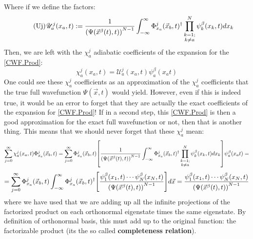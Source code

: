 \documentclass[11pt, a4paper]{article} %
\newcommand{\U}{\mathscr{U}}
\begin{document}
Where if we define the factors:
\begin{equation}\label{Uj}\tag{Uj}
\U^j_a(x_a,t):=\frac{1}{ \qty(\Psi(\vec{x}^\beta(t),t))^{N-1}} \int_{-\infty}^\infty \Phi_{x_a}^j(\vec{x}_b,t)^\dagger \prod_{\substack{k=1; \\ k\neq a}}^{N}\psi^\beta_k(x_k,t) dx_k \vspace{-0.3cm}
\end{equation}
Then, we are left with the $\chi^j_a$ adiabatic coefficients of the expansion for the \ref{CWF.Prod}:
$$
\chi_a^j(x_a,t)= \U^j_a(x_a,t)\psi_a^\beta(x_a t)
$$
One could see these $\chi^j_a$ coefficients as an approximation of the $\chi_a^j$ coefficients that the true full wavefunction $\Psi(\vec{x},t)$ would yield. However, even if this is indeed true, it would be an error to forget that they are actually the exact coefficients of the expansion for \ref{CWF.Prod}! If in a second step, this \ref{CWF.Prod} is then a good approximation for the exact full wavefunction or not, then that is another thing. This means that we should never forget that these $\chi_a^j$ mean:
$$
\sum_{j=0}^\infty \chi^j_a(x_a,t) \Phi_{x_a}^j(\vec{x}_b,t) = \sum_{j=0}^\infty \Phi_{x_a}^j(\vec{x}_b,t) \qty[\frac{1}{ \qty(\Psi(\vec{x}^\beta(t),t))^{N-1}}\int_{-\infty}^\infty \Phi_{x_a}^j(\vec{x}_b,t)^\dagger \prod_{\substack{k=1; \\ k\neq a}}^{N} \psi^\beta_k(x_k,t) dx_k ] \psi_a^\beta(x_a t)=
$$
$$
=\sum_{j=0}^\infty \Phi_{x_a}^j(\vec{x}_b,t)\int_{-\infty}^\infty \Phi_{x_a}^j(\vec{x}_b,t)^\dagger \qty[ \frac{\psi^\beta_1(x_1,t)\cdots \psi^\beta_N(x_N,t) }{\qty(\Psi(\vec{x}^\beta(t),t))^{N-1}} ]d\vec{x}=\frac{\psi^\beta_1(x_1,t)\cdots \psi^\beta_N(x_N,t) }{\qty(\Psi(\vec{x}^\beta(t),t))^{N-1}}
$$
where we have used that we are adding up all the infinite projections of the factorized product on each orthonormal eigenstate times the same eigenstate. By definition of orthonormal basis, this must add up to the original function: the factorizable product (its the so called {\bf completeness relation}).
\end{document}
